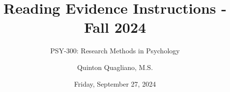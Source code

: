 \documentclass[
  12pt,
  letterpaper,
]{scrartcl}
\title{Reading Evidence Instructions - Fall 2024}
\subtitle{PSY-300: Research Methods in Psychology}
\author{Quinton Quagliano, M.S.}
\date{Friday, September 27, 2024}
\begin{document}


\begin{titlepage}


\newcommand{\titlepagepagealign}{
\ifthenelse{\equal{center}{right}}{\raggedleft}{}
\ifthenelse{\equal{center}{center}}{\centering}{}
\ifthenelse{\equal{center}{left}}{\raggedright}{}
}


\newcommand{\titleandsubtitle}{
{{\huge{\bfseries{\nohyphens{Reading Evidence Instructions - Fall
2024}}}}\par
}%

\vspace{\betweentitlesubtitle}
{
{\Large{\nohyphens{PSY-300: Research Methods in Psychology}}}\par
}}
\newcommand{\titlepagetitleblock}{
\newcommand{\HRule}{\rule{\linewidth}{0.5mm}} 

\HRule\\[0.4cm]

\titleandsubtitle

\HRule\\
}
\newcommand{\authorstyle}[1]{{\small{#1}}}

\newcommand{\affiliationstyle}[1]{{\small{#1}}}

\newcommand{\titlepageauthorblock}{
\newlength{\miniA}
\setlength{\miniA}{0pt}
\newlength{\namelen}
\settowidth{\namelen}{Quinton Quagliano,
M.S.}\setlength{\miniA}{\maxof{\miniA}{\namelen}}
\setlength{\miniA}{\miniA+0.05\textwidth}
\newlength{\miniB}
\setlength{\miniB}{0.99\textwidth - \miniA}
\begin{minipage}{\miniA}
\begin{flushleft}
{\authorstyle{Quinton Quagliano, M.S.}}
\end{flushleft}
\end{minipage}
\begin{minipage}{\miniB}
\begin{flushright}
{\affiliationstyle{Department of Psychology
\\}}
\end{flushright}
\end{minipage}}

\newcommand{\titlepageaffiliationblock}{}
\newcommand{\headerstyled}{%
{\textsc{\LARGE{}}}
}
\newcommand{\footerstyled}{%
{}
}
\newcommand{\datestyled}{%
{\large{Friday, September 27, 2024}}
}


\newcommand{\titlepageheaderblock}{\headerstyled}


\end{titlepage}
\end{document}
